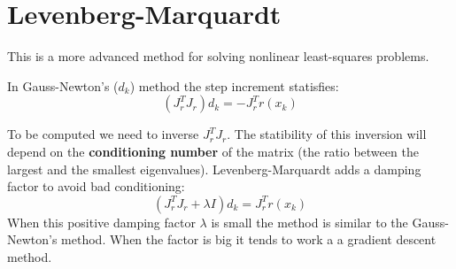 \section{Levenberg-Marquardt}

This is a more advanced method for solving nonlinear least-squares problems.

In Gauss-Newton's ($d_k$) method the step increment statisfies:
\begin{equation}
    (J_r^TJ_r)d_k = -J_r^Tr(x_k)
\end{equation}

To be computed we need to inverse $J_r^TJ_r$. The statibility of this inversion will depend on the \textbf{conditioning number} of the matrix (the ratio between the largest and the smallest eigenvalues).
Levenberg-Marquardt adds a damping factor to avoid bad conditioning:
\begin{equation}
    (J_r^TJ_r + \lambda I) d_k = J_r^T r(x_k)
\end{equation}
When this positive damping factor $\lambda$ is small the method is similar to the Gauss-Newton's method. When the factor is big it tends to work a a gradient descent method.